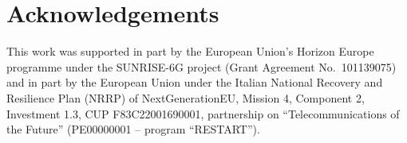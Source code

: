 \documentclass[a4paper,fleqn]{cas-sc}
\begin{document}

\printcredits

\section*{Acknowledgements}
This work was supported in part by the European Union's Horizon Europe programme under the SUNRISE-6G project (Grant Agreement No.\ 101139075) and in part by the European Union under the Italian National Recovery and Resilience Plan (NRRP) of NextGenerationEU, Mission 4, Component 2, Investment 1.3, CUP F83C22001690001, partnership on ``Telecommunications of the Future'' (PE00000001 -- program ``RESTART'').





\end{document}
